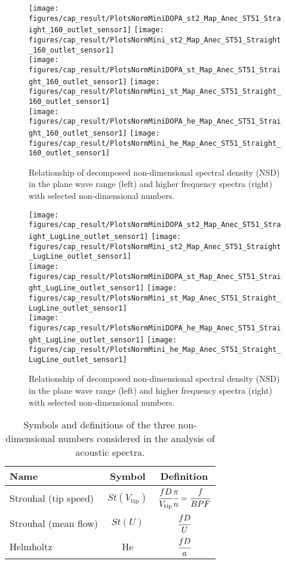 \begin{figure}[tb!]
\centering
\texttt{[image: figures/cap\_result/PlotsNormMiniDOPA\_st2\_Map\_Anec\_ST51\_Straight\_160\_outlet\_sensor1]}
\texttt{[image: figures/cap\_result/PlotsNormMini\_st2\_Map\_Anec\_ST51\_Straight\_160\_outlet\_sensor1]}\\[4mm]
\texttt{[image: figures/cap\_result/PlotsNormMiniDOPA\_st\_Map\_Anec\_ST51\_Straight\_160\_outlet\_sensor1]}
\texttt{[image: figures/cap\_result/PlotsNormMini\_st\_Map\_Anec\_ST51\_Straight\_160\_outlet\_sensor1]}\\[4mm]
\texttt{[image: figures/cap\_result/PlotsNormMiniDOPA\_he\_Map\_Anec\_ST51\_Straight\_160\_outlet\_sensor1]}
\texttt{[image: figures/cap\_result/PlotsNormMini\_he\_Map\_Anec\_ST51\_Straight\_160\_outlet\_sensor1]}
\caption{Relationship of decomposed non-dimensional spectral density (NSD) in the plane wave range (left) and higher frequency spectra (right) with selected non-dimensional numbers.}
\label{fig:result_norm_all}
\end{figure}

\begin{figure}[tb!]
\centering
\texttt{[image: figures/cap\_result/PlotsNormMiniDOPA\_st2\_Map\_Anec\_ST51\_Straight\_LugLine\_outlet\_sensor1]}
\texttt{[image: figures/cap\_result/PlotsNormMini\_st2\_Map\_Anec\_ST51\_Straight\_LugLine\_outlet\_sensor1]}\\[4mm]
\texttt{[image: figures/cap\_result/PlotsNormMiniDOPA\_st\_Map\_Anec\_ST51\_Straight\_LugLine\_outlet\_sensor1]}
\texttt{[image: figures/cap\_result/PlotsNormMini\_st\_Map\_Anec\_ST51\_Straight\_LugLine\_outlet\_sensor1]}\\[4mm]
\texttt{[image: figures/cap\_result/PlotsNormMiniDOPA\_he\_Map\_Anec\_ST51\_Straight\_LugLine\_outlet\_sensor1]}
\texttt{[image: figures/cap\_result/PlotsNormMini\_he\_Map\_Anec\_ST51\_Straight\_LugLine\_outlet\_sensor1]}
\caption{Relationship of decomposed non-dimensional spectral density (NSD) in the plane wave range (left) and higher frequency spectra (right) with selected non-dimensional numbers.}
\label{fig:result_norm_all_LL}
\end{figure}


\begin{table}
\centering
\caption{Symbols and definitions of the three non-dimensional numbers considered in the analysis of acoustic spectra.}
\footnotesize
\begin{tabular}{lcc}
\toprule
\textbf{Name} & \textbf{Symbol} & \textbf{Definition}\\\midrule
Strouhal (tip speed)& $St(V_\text{tip})$ & $\cfrac{f D}{V_\text{tip}}\cfrac{\pi}{n}=\cfrac{f}{BPF}$ \\[4mm]
Strouhal (mean flow) & $St(U)$ & $\cfrac{f D}{U}$ \\[4mm]
Helmholtz & He & $\cfrac{f D}{a}$ \\[2mm] \bottomrule
\end{tabular}
\label{tab:nondim_numbers}
\end{table}

